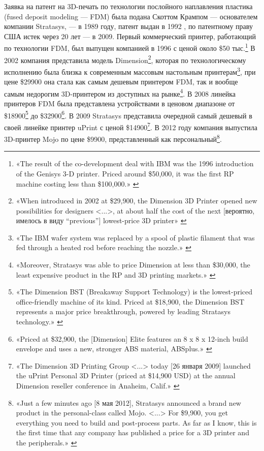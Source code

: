 \documentclass{article}
\begin{document}
Заявка на патент на 3D-печать по технологии послойного наплавления пластика (fused deposit modeling — FDM) была подана Скоттом Крампом — основателем компании Stratasys, — в 1989 году, патент выдан в 1992 \cite{fdmPatentUS5121329}, по патентному праву США истек через 20 лет — в 2009. Первый коммерческий принтер, работающий по технологии FDM, был выпущен компанией в 1996 с ценой около \$50 тыс.\footnote{«The result of the co-development deal with IBM was the 1996 introduction of the Genisys 3-D printer. Priced around \$50,000, it was the first RP machine costing less than \$100,000.» \cite{fundingUniverseStratasysHistory2005}} В 2002 компания представила модель Dimension\footnote{«When introduced in 2002 at \$29,900, the Dimension 3D Printer opened new possibilities for designers <...>, at about half the cost of the next [вероятно, имелось в виду “previous”] lowest-price 3D printer» \cite{stratasysDimension2002}}, которая по технологическому исполнению была близка к современным массовым настольным принтерам\footnote{«The IBM wafer system was replaced by a spool of plastic filament that was fed through a heated rod before reaching the nozzle.» \cite{fundingUniverseStratasysHistory2005}}, при цене \$29900 она стала как самым дешевым принтером FDM, так и вообще самым недорогим 3D-принтером из доступных на рынке\footnote{«Moreover, Stratasys was able to price Dimension at less than \$30,000, the least expensive product in the RP and 3D printing markets.» \cite{fundingUniverseStratasysHistory2005}}. В 2008 линейка принтеров FDM была представлена устройствами в ценовом диапазоне от \$18900\footnote{«The Dimension BST (Breakaway Support Technology) is the lowest-priced office-friendly machine of its kind. Priced at \$18,900, the Dimension BST represents a major price breakthrough, powered by leading Stratasys technology.» \cite{stratasysDimensionBst2008}} до \$32900\footnote{«Priced at \$32,900, the [Dimension] Elite features an 8 x 8 x 12-inch build envelope and uses a new, stronger ABS material, ABSplus.» \cite{stratasysElite2008}}. В 2009 Stratasys представила очередной самый дешевый в своей линейке принтер uPrint с ценой \$14900\footnote{«The Dimension 3D Printing Group <...> today [26 января 2009] launched the uPrint Personal 3D Printer (priced at \$14,900 USD) at the annual Dimension reseller conference in Anaheim, Calif.» \cite{stratasysUPrintRelease2009}}. В 2012 году компания выпустила 3D-принтер Mojo по цене \$9900, представленный как персональный\footnote{«Just a few minutes ago [8 мая 2012], Stratasys announced a brand new product in the personal-class called Mojo. <...> For \$9,900, you get everything you need to build and post-process parts. As far as I know, this is the first time that any company has published a price for a 3D printer and the peripherals.» \cite{engineeringStratasysMojo2012}}.
\end{document}
